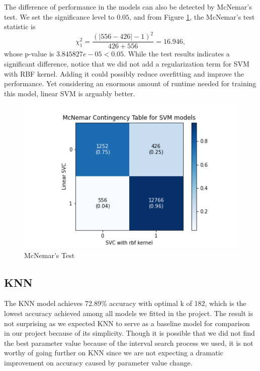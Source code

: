 \documentclass[10pt,twocolumn]{article}
\begin{document}
	The difference of performance in the models can also be detected by McNemar's test.  We set the significance level to $0.05$, and from Figure \ref{McNemar_SVM}, the McNemar's test statistic is $$\chi^2_{1} = \frac{(|556-426|-1)^2}{426+556} = 16.946,$$ whose p-value is $3.845827e-05 < 0.05$. While the test results indicates a significant difference, notice that we did not add a regularization term for SVM with RBF kernel. Adding it could possibly reduce overfitting and improve the performance. Yet considering an enormous amount of runtime needed for training this model, linear SVM is arguably better. 
	\begin{figure}[H]
		\includegraphics[width=\columnwidth]{McNemar_SVM}
		\caption{McNemar's Test}\label{McNemar_SVM}
	\end{figure} 
	\subsection{KNN}
	The KNN model achieves 72.89\% accuracy with optimal k of 182, which is the lowest accuracy achieved among all models we fitted in the project. The result is not surprising as we expected KNN to serve as a baseline model for comparison in our project because of its simplicity. Though it is possible that we did not find the best parameter value because of the interval search process we used, it is not worthy of going further on KNN since we are not expecting a dramatic improvement on accuracy caused by parameter value change.
\end{document}
